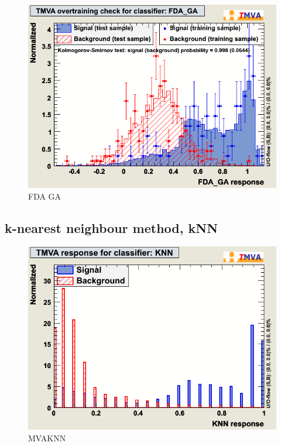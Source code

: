 \begin{figure}[h]
\begin{center}
\includegraphics[width=1.0\textwidth]{images/pkOvertrain_FDA_GA.png}
\caption{FDA GA }
\label{fig:pkOvertrainFDAGA}
\end{center}
\end{figure}


\subsection{k-nearest neighbour method, kNN}

\begin{figure}[h]
\begin{center}
\includegraphics[width=1.0\textwidth]{images/pkMva_KNN.png}
\caption{MVAKNN}
\label{fig:pkMvaKNN}
\end{center}
\end{figure}

